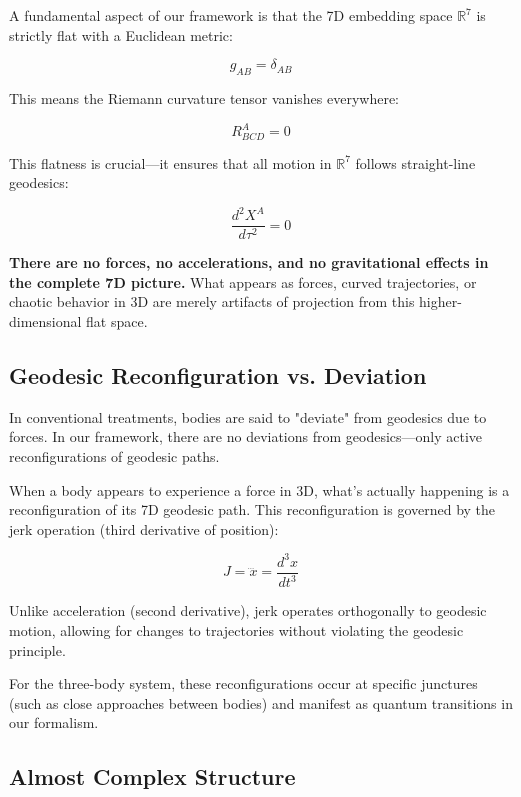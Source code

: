 \documentclass{article}
\begin{document}
A fundamental aspect of our framework is that the 7D embedding space $\mathbb{R}^7$ is strictly flat with a Euclidean metric:

\begin{equation}
g_{AB} = \delta_{AB}
\end{equation}

This means the Riemann curvature tensor vanishes everywhere:

\begin{equation}
R^A_{BCD} = 0
\end{equation}

This flatness is crucial—it ensures that all motion in $\mathbb{R}^7$ follows straight-line geodesics:

\begin{equation}
\frac{d^2 X^A}{d\tau^2} = 0
\end{equation}

\textbf{There are no forces, no accelerations, and no gravitational effects in the complete 7D picture.} What appears as forces, curved trajectories, or chaotic behavior in 3D are merely artifacts of projection from this higher-dimensional flat space.

\subsection{Geodesic Reconfiguration vs. Deviation}

In conventional treatments, bodies are said to "deviate" from geodesics due to forces. In our framework, there are no deviations from geodesics—only active reconfigurations of geodesic paths. 

When a body appears to experience a force in 3D, what's actually happening is a reconfiguration of its 7D geodesic path. This reconfiguration is governed by the jerk operation (third derivative of position):

\begin{equation}
J = \dddot{x} = \frac{d^3x}{dt^3}
\end{equation}

Unlike acceleration (second derivative), jerk operates orthogonally to geodesic motion, allowing for changes to trajectories without violating the geodesic principle.

For the three-body system, these reconfigurations occur at specific junctures (such as close approaches between bodies) and manifest as quantum transitions in our formalism.

\subsection{Almost Complex Structure}
\end{document}
